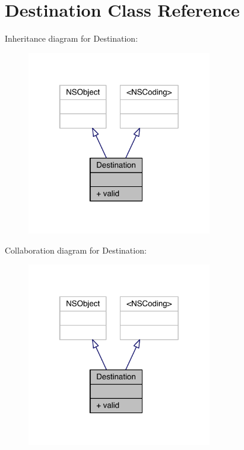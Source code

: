 \hypertarget{interface_destination}{\section{Destination Class Reference}
\label{interface_destination}
}


Inheritance diagram for Destination\-:\nopagebreak
\begin{figure}[H]
\begin{center}
\leavevmode
\includegraphics[width=229pt]{interface_destination__inherit__graph}
\end{center}
\end{figure}


Collaboration diagram for Destination\-:\nopagebreak
\begin{figure}[H]
\begin{center}
\leavevmode
\includegraphics[width=229pt]{interface_destination__coll__graph}
\end{center}
\end{figure}
